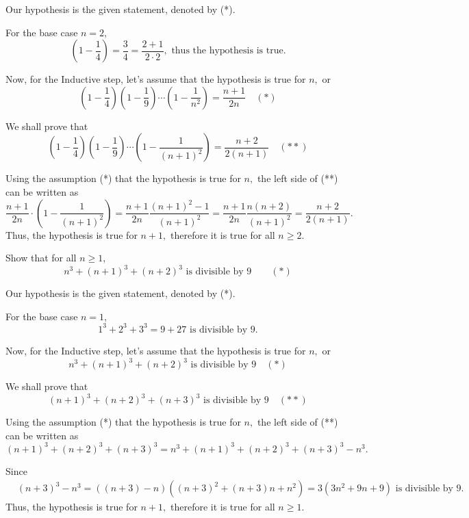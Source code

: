 \documentclass{article}
\begin{document}
\begin{soln}
    Our hypothesis is the given statement, denoted by (*).

    For the base case $n=2,$ 
    \[
        \left(1 - \frac{1}{4}\right) = \frac{3}{4} = \frac{2+1}{2\cdot 2}, \text{\  thus the hypothesis is true.}
    \]
    
    Now, for the Inductive step, let's assume that the hypothesis is true for $n,$ or
    \[
        \left(1 - \frac{1}{4}\right) \left(1 - \frac{1}{9}\right) \cdots \left(1 - \frac{1}{n^2}\right) = \frac{n+1}{2n} \quad (*)
    \]

    We shall prove that
    \[
        \left(1 - \frac{1}{4}\right) \left(1 - \frac{1}{9}\right) \cdots \left(1 - \frac{1}{(n+1)^2}\right) = \frac{n+2}{2(n+1)} \quad (**)
    \]

    Using the assumption (*) that the hypothesis is true for $n,$ the left side of (**) can be written as
    \[
        \frac{n+1}{2n} \cdot  \left(1 - \frac{1}{(n+1)^2}\right) = \frac{n+1}{2n} \frac{(n+1)^2-1}{(n+1)^2} 
        = \frac{n+1}{2n} \frac{n(n+2)}{(n+1)^2} = \frac{n+2}{2(n+1)}.
    \]
    Thus, the hypothesis is true for $n+1,$ therefore it is true for all $n \ge 2.$
\end{soln}

\newpage

\begin{example}
    Show that for all $n \ge 1,$
    \[
        n^3 + (n+1)^3 + (n+2)^3 \text{\ is divisible by\ } 9 \qquad (*)
    \]
\end{example}

\begin{soln}
    Our hypothesis is the given statement, denoted by (*).

    For the base case $n=1,$ 
    \[
        1^3 + 2^3 + 3^3 = 9 + 27 \text{\ is divisible by\ } 9.
    \]
    
    Now, for the Inductive step, let's assume that the hypothesis is true for $n,$ or
    \[
        n^3 + (n+1)^3 + (n+2)^3 \text{\ is divisible by\ } 9 \quad (*)
    \]

    We shall prove that
    \[
        (n+1)^3 + (n+2)^3 + (n+3)^3 \text{\ is divisible by\ } 9 \quad (**)
    \]

    Using the assumption (*) that the hypothesis is true for $n,$ the left side of (**) can be written as
    \[
        (n+1)^3 + (n+2)^3 + (n+3)^3 = n^3 + (n+1)^3 + (n+2)^3 + (n+3)^3 - n^3.
    \]

    Since
    \[
        \begin{aligned}
            &(n+3)^3 - n^3 = \left( (n+3)-n\right)\left((n+3)^2 + (n+3)n + n^2\right)
            = 3(3n^2+9n+9) \text{\ is divisible by\ } 9.
        \end{aligned}
    \]
    Thus, the hypothesis is true for $n+1,$ therefore it is true for all $n \ge 1.$
\end{soln}
\end{document}
